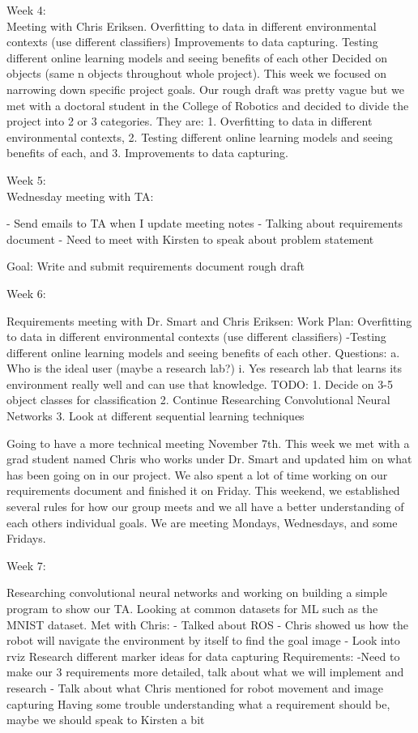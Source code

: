 \documentclass[draftclsnofoot, onecolumn, 10pt, compsoc]{IEEEtran}
\begin{document}
Week 4:
\\ \indent Meeting with Chris Eriksen. Overfitting to data in different environmental contexts (use different classifiers) 
Improvements to data capturing. Testing different online learning models and seeing benefits of each other
Decided on objects (same n objects throughout whole project). This week we focused on narrowing down specific project goals. Our rough draft was pretty vague but we met with a doctoral student in the College of Robotics and decided to divide the project into 2 or 3 categories. They are: 1. Overfitting to data in different environmental contexts, 2. Testing different online learning models and seeing benefits of each, and 3. Improvements to data capturing.

Week 5:
\\ \indent Wednesday meeting with TA:

- Send emails to TA when I update meeting notes
- Talking about requirements document
- Need to meet with Kirsten to speak about problem statement
	
Goal: Write and submit requirements document rough draft

Week 6:

	Requirements meeting with Dr. Smart and Chris Eriksen:
Work Plan: Overfitting to data in different environmental contexts (use different classifiers) 
-Testing different online learning models and seeing benefits of each other.
Questions:
    a. Who is the ideal user (maybe a research lab?)
    i. Yes research lab that learns its environment really well and can use that knowledge.
	TODO:
		1. Decide on 3-5 object classes for classification
		2. Continue Researching Convolutional Neural Networks
		3. Look at different sequential learning techniques
	
Going to have a more technical meeting November 7th. This week we met with a grad student named Chris who works under Dr. Smart and updated him on what has been going on in our project. We also spent a lot of time working on our requirements document and finished it on Friday. This weekend, we established several rules for how our group meets and we all have a better understanding of each others individual goals. We are meeting Mondays, Wednesdays, and some Fridays.

Week 7:

	Researching convolutional neural networks and working on building a simple program to show our TA. Looking at common datasets for ML such as the MNIST dataset. Met with Chris:
	- Talked about ROS
	- Chris showed us how the robot will navigate the environment by itself to find the goal image
	- Look into rviz
Research different marker ideas for data capturing
Requirements:
	-Need to make our 3 requirements more detailed, talk about what we will implement and research
	- Talk about what Chris mentioned for robot movement and image capturing
Having some trouble understanding what a requirement should be, maybe we should speak to Kirsten a bit
\end{document}
